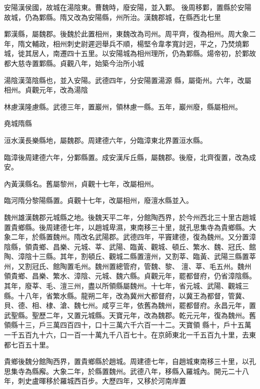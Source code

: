 \begin{pinyinscope}
 安陽漢侯國，故城在湯陰東。曹魏時，廢安陽，並入鄴。
 後周移鄴，置縣於安陽故城，仍為鄴縣。隋又改為安陽縣，州所治。漢魏郡城，在縣西北七里



 鄴漢縣，屬魏郡。後魏於此置相州，東魏改為司州。周平齊，復為相州。周大象二年，隋文輔政，相州刺史尉遲迥舉兵不順，楊堅令韋孝寬討迥，平之，乃焚燒鄴城，徙其居人，南遷四十五里。以安陽城為相州理所，仍為鄴縣。煬帝初，於鄴故都大慈寺置鄴縣。貞觀八年，始築今治所小城



 湯陰漢蕩陰縣也，並入安陽。武德四年，分安陽置湯源
 縣，屬衛州。六年，改屬相州。貞觀元年，改為湯陰



 林慮漢隆慮縣。武德三年，置巖州，領林慮一縣。五年，巖州廢，縣屬相州。



 堯城隋縣



 洹水漢長樂縣地，屬魏郡。周建德六年，分臨漳東北界置洹水縣。



 臨漳後周建德六年，分鄴縣置。成安漢斥丘縣，屬魏郡。後廢，北齊復置，改為成安。



 內黃漢縣名。舊屬黎州，貞觀十七年，改屬相州。



 臨河隋分黎陽縣置。貞觀十七年，改屬相州，廢澶水縣並入。



 魏州雄漢魏郡元城縣之地。後魏天平二年，分館陶西界，於今州西北三十里古趙城置貴鄉縣。後周建德七年，以趙城卑濕，東南移三十里，就孔思集寺為貴鄉縣。大象二年，於縣置魏州。隋改名武陽郡。武德四年，平竇建德，復為魏州。又分置漳陰縣，領貴鄉、昌樂、元城、莘、武陽、臨黃、觀城、頓丘、繁水、魏、冠氏、館陶、漳陰十三縣。其年，割頓丘、觀城二縣置澶州，又割莘、臨黃、武陽三縣置莘州，又割冠氏、館陶置毛州。魏州置總管府，管魏、黎、
 澶、莘、毛五州。魏州領貴鄉、昌樂、繁水、漳陰、元城、魏六縣。貞觀元年，罷都督府，仍省漳陰縣。其年，廢莘、毛、澶三州，盡以所領縣屬魏州。十七年，省元城、武陽、觀城三縣。十八年，省繁水縣。龍朔二年，改為冀州大都督府，以冀王為都督，管冀、貝、德、相、棣、滄、魏七州。咸亨三年，依舊為魏州，罷都督府。永昌元年，置武聖縣。聖歷二年，又置元城縣。天寶元年，改為魏郡。乾元元年，復為魏州。舊領縣十三，戶三萬四百四十，口十三萬六千六百一十二。天寶領
 縣十，戶十五萬一千五百九十六，口一百一十萬九千八百七十。在京師東北一千五百九十里，去東都七百五十里。



 貴鄉後魏分館陶西界，置貴鄉縣於趙城。周建德七年，自趙城東南移三十里，以孔思集寺為縣廨。大象二年，於縣置魏州。武德八年，移縣入羅城內。開元二十八年，刺史盧暉移於羅城西百步。大歷四年，又移於河南岸置




\end{pinyinscope}
